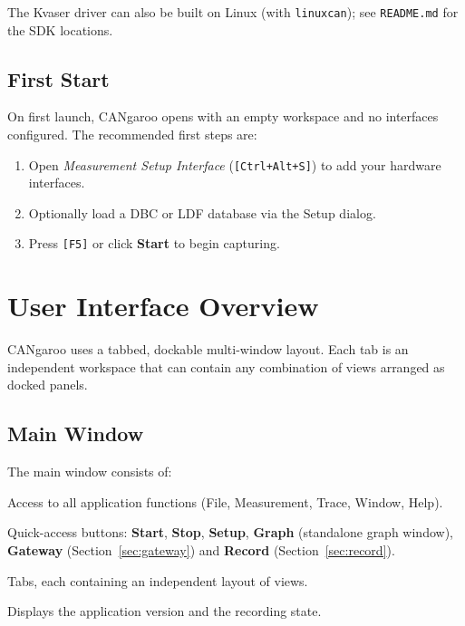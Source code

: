 \documentclass[a4paper,11pt]{article}
\newcommand{\key}[1]{\texttt{\small[#1]}}
\newcommand{\menu}[1]{\textit{#1}}
\newcommand{\ui}[1]{\textbf{#1}}
\newcommand{\file}[1]{\texttt{#1}}
\begin{document}
The Kvaser driver can also be built on Linux (with \texttt{linuxcan}); see
\file{README.md} for the SDK locations.

\subsection{First Start}

On first launch, CANgaroo opens with an empty workspace and no interfaces configured.
The recommended first steps are:

\begin{enumerate}
  \item Open \menu{Measurement \textrightarrow{} Setup Interface} (\key{Ctrl+Alt+S}) to add
        your hardware interfaces.
  \item Optionally load a DBC or LDF database via the Setup dialog.
  \item Press \key{F5} or click \ui{Start} to begin capturing.
\end{enumerate}

\section{User Interface Overview}

CANgaroo uses a tabbed, dockable multi-window layout. Each tab is an independent
workspace that can contain any combination of views arranged as docked panels.

\subsection{Main Window}

The main window consists of:

\begin{description}[leftmargin=2em, style=nextline]
  \item[Menu bar] Access to all application functions (File, Measurement, Trace, Window, Help).
  \item[Toolbar] Quick-access buttons: \ui{Start}, \ui{Stop}, \ui{Setup}, \ui{Graph}
        (standalone graph window), \ui{Gateway} (Section~\ref{sec:gateway}) and
        \ui{Record} (Section~\ref{sec:record}).
  \item[Tab bar] Tabs, each containing an independent layout of views.
  \item[Status bar] Displays the application version and the recording state.
\end{description}
\end{document}
